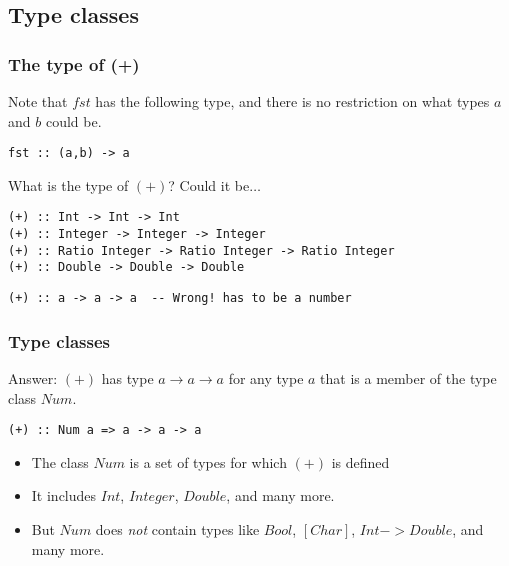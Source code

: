 \documentclass{beamer}
\begin{document}
\subsection{Type classes}
\begin{frame}[fragile]
\frametitle{The type of (+)}

Note that $fst$ has the following type, and there is no restriction
on what types $a$ and $b$ could be.

\begin{verbatim}
fst :: (a,b) -> a
\end{verbatim}

What is the type of $(+)$?  Could it be$\ldots$

\begin{verbatim}
(+) :: Int -> Int -> Int
(+) :: Integer -> Integer -> Integer
(+) :: Ratio Integer -> Ratio Integer -> Ratio Integer
(+) :: Double -> Double -> Double
\end{verbatim}

\begin{verbatim}
(+) :: a -> a -> a  -- Wrong! has to be a number
\end{verbatim}

\end{frame}

\begin{frame}[fragile]
\frametitle{Type classes}

Answer: $(+)$ has type $a \rightarrow a \rightarrow a$ for any type $a$ that is a
member of the type class $Num$.

\begin{verbatim}
(+) :: Num a => a -> a -> a
\end{verbatim}

\begin{itemize}
\item The class $Num$ is a set of types for which $(+)$ is defined
\item It includes $Int$, $Integer$, $Double$, and many more.
\item But $Num$ does \emph{not} contain types like $Bool$,
  $[Char]$, $Int->Double$, and many more.
\end{itemize}

\end{frame}
\end{document}
